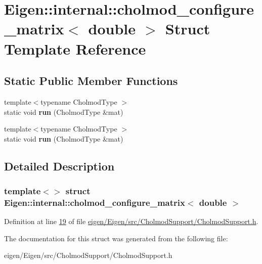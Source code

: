 \hypertarget{struct_eigen_1_1internal_1_1cholmod__configure__matrix_3_01double_01_4}{}\section{Eigen\+:\+:internal\+:\+:cholmod\+\_\+configure\+\_\+matrix$<$ double $>$ Struct Template Reference}
\label{struct_eigen_1_1internal_1_1cholmod__configure__matrix_3_01double_01_4}
\subsection*{Static Public Member Functions}
\begin{DoxyCompactItemize}
\item 
\mbox{\label{struct_eigen_1_1internal_1_1cholmod__configure__matrix_3_01double_01_4_a2070738f3a67504dea541cf1068b61da}} 
{\footnotesize template$<$typename Cholmod\+Type $>$ }\\static void {\bfseries run} (Cholmod\+Type \&mat)
\item 
\mbox{\label{struct_eigen_1_1internal_1_1cholmod__configure__matrix_3_01double_01_4_a2070738f3a67504dea541cf1068b61da}} 
{\footnotesize template$<$typename Cholmod\+Type $>$ }\\static void {\bfseries run} (Cholmod\+Type \&mat)
\end{DoxyCompactItemize}


\subsection{Detailed Description}
\subsubsection*{template$<$$>$\newline
struct Eigen\+::internal\+::cholmod\+\_\+configure\+\_\+matrix$<$ double $>$}



Definition at line \hyperlink{eigen_2_eigen_2src_2_cholmod_support_2_cholmod_support_8h_source_l00019}{19} of file \hyperlink{eigen_2_eigen_2src_2_cholmod_support_2_cholmod_support_8h_source}{eigen/\+Eigen/src/\+Cholmod\+Support/\+Cholmod\+Support.\+h}.



The documentation for this struct was generated from the following file\+:\begin{DoxyCompactItemize}
\item 
eigen/\+Eigen/src/\+Cholmod\+Support/\+Cholmod\+Support.\+h\end{DoxyCompactItemize}
